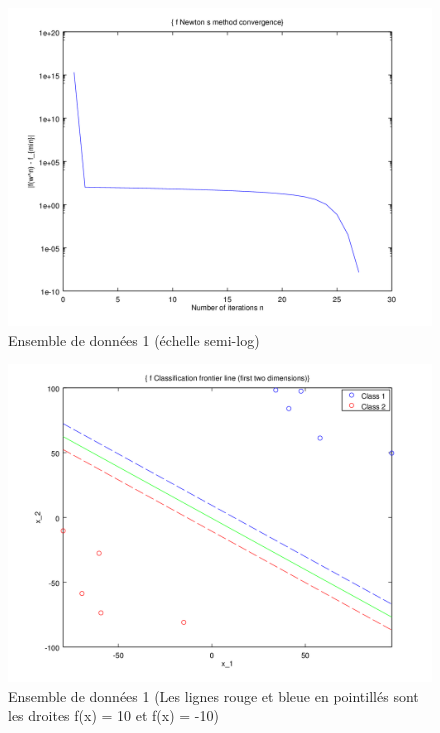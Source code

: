 \documentclass{article}
\begin{document}
         \begin{figure}[H]
           \begin{center}
             \includegraphics[scale=0.5]{images/cvnewton1.png}
             \caption{Ensemble de données 1 (échelle semi-log)}
           \end{center}
         \end{figure}

         \begin{figure}[H]
           \begin{center}
             \includegraphics[scale=0.5]{images/line1.png}
             \caption{Ensemble de données 1 (Les lignes rouge et bleue en pointillés sont les droites f(x) = 10 et f(x) = -10)}
           \end{center}
         \end{figure}
\end{document}

